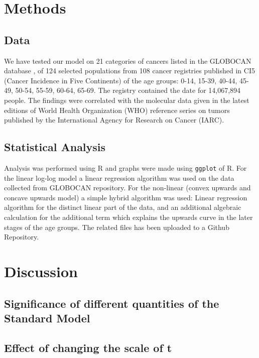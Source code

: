\documentclass[lineno,sn-basic, Numbered]{sn-jnl}%
\theoremstyle{thmstyleone}%
\theoremstyle{thmstyletwo}%
\theoremstyle{thmstylethree}%
\begin{document}
\vspace{20em} 

\section{Methods}\label{sec11}

\subsection{Data}
We have tested our model on 21 categories of cancers listed in the GLOBOCAN database \cite{globocan}, of 124 selected populations from 108 cancer registries published in CI5 (Cancer Incidence in Five Continents) of the age groups: 0-14, 15-39, 40-44, 45-49, 50-54, 55-59, 60-64, 65-69. The registry contained the date for 14,067,894 people. The findings were correlated with the molecular data given in the latest editions of World Health Organization (WHO) reference series on tumors published by the International Agency for Research on Cancer (IARC).
\subsection{Statistical Analysis}
Analysis was performed using R \cite{rproject2022} and graphs were made using \texttt{ggplot} of R. For the linear log-log model a linear regression algorithm was used on the data collected from GLOBOCAN repository. For the non-linear (convex upwards and concave upwards model) a simple hybrid algorithm was used: Linear regression algorithm for the distinct linear part of the data, and an additional algebraic calculation for the additional term which explains the upwards curve in the later stages of the age groups. The related files has been uploaded to a Github Repository. \cite{MathematicalCancer}

\section{Discussion}\label{sec12}

\subsection{Significance of different quantities of the Standard Model}

\subsection{Effect of changing the scale of  t}
\end{document}
